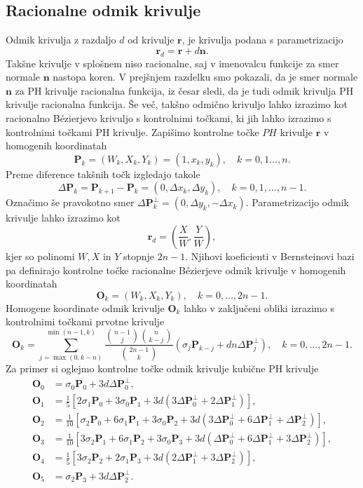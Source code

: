 \documentclass[isrm2, tisk]{fmfdelo}
\newcommand{\mycomment}[1]{\textbf{\textcolor{red}{#1}}}
\begin{document}
    \subsection{Racionalne odmik krivulje}
    Odmik krivulja z razdaljo $d$ od krivulje $\mathbf{r}$, je krivulja podana s parametrizacijo \[\mathbf{r}_d=\mathbf{r} + d\mathbf{n}.\]
    Takšne krivulje v splošnem niso racionalne, saj v imenovalcu funkcije za smer normale $\mathbf{n}$ nastopa koren.
    V prejšnjem razdelku smo pokazali, da je smer normale $\mathbf{n}$ za PH krivulje racionalna funkcija, iz česar sledi, da je tudi odmik krivulja PH krivulje racionalna funkcija.
    Še več, takšno odmično krivuljo lahko izrazimo kot racionalno Bézierjevo krivuljo s kontrolnimi točkami, ki jih lahko izrazimo s kontrolnimi točkami PH krivulje.
    Zapišimo kontrolne točke $PH$ krivulje $\mathbf{r}$ v homogenih koordinatah
    \[\mathbf{P}_k = (W_k,X_k,Y_k) = (1,x_k,y_k), \quad k=0,1\ldots,n. \]
    Preme diference takšnih točk izgledajo takole
    \[\Delta\mathbf{P}_k = \mathbf{P}_{k+1}-\mathbf{P}_k = (0,\Delta x_k,\Delta y_k), \quad k=0,1,\ldots,n-1.\]
    Označimo še pravokotno smer $\Delta\mathbf{P}_k^{\perp} =  (0,\Delta y_k, -\Delta x_k)$.
    Parametrizacijo odmik krivulje lahko izrazimo kot
    \[\mathbf{r}_d=\left(\frac{X}{W}, \frac{Y}{W}\right),\]
    kjer so polinomi $W,X$ in $Y$ stopnje $2n-1$.
    Njihovi koeficienti v Bernsteinovi bazi pa definirajo kontrolne točke racionalne Bézierjeve odmik krivulje v homogenih koordinatah
    \[\mathbf{O}_k=(W_k,X_k,Y_k),\quad k=0,\ldots,2n-1.\]
    Homogene koordinate odmik krivulje $\mathbf{O}_k$ lahko v zaključeni obliki izrazimo s kontrolnimi točkami prvotne krivulje
    \[\mathbf{O}_k= \sum_{j=\max(0,k-n)}^{\min(n-1,k)} \frac{\binom{n-1}{j}\binom{n}{k-j} }{\binom{2n-1}{k}}(\sigma_j\mathbf{P}_{k-j} + dn\Delta \mathbf{P}_j^{\perp}),\quad k=0,\ldots,2n-1.        \]
    Za primer si oglejmo kontrolne točke odmik krivulje kubične PH krivulje
    \begin{align*}
        \mathbf{O}_0 &= \sigma_0\mathbf{P}_0+3d\Delta\mathbf{P}_0^{\perp},  \\
        \mathbf{O}_1 &= \frac{1}{5} \left[ 2\sigma_1\mathbf{P}_0+ 3\sigma_0\mathbf{P}_1 + 3d(3\Delta\mathbf{P}_0^{\perp} + 2\Delta\mathbf{P}_1^{\perp})\right], \\
        \mathbf{O}_2 &= \frac{1}{10} \left[\sigma_2\mathbf{P}_0+ 6\sigma_1\mathbf{P}_1 + 3\sigma_0\mathbf{P}_2 + 3d(3\Delta\mathbf{P}_0^{\perp} + 6\Delta\mathbf{P}_1^{\perp}+\Delta\mathbf{P}_2^{\perp})\right], \\
        \mathbf{O}_3 &= \frac{1}{10} \left[3\sigma_2\mathbf{P}_1+ 6\sigma_1\mathbf{P}_2 + 3\sigma_0\mathbf{P}_3 + 3d(\Delta\mathbf{P}_0^{\perp} + 6\Delta\mathbf{P}_1^{\perp}+3\Delta\mathbf{P}_2^{\perp})\right], \\
        \mathbf{O}_4 &= \frac{1}{5} \left[3\sigma_2\mathbf{P}_2+ 2\sigma_1\mathbf{P}_3 + 3d(2\Delta\mathbf{P}_1^{\perp} + 3\Delta\mathbf{P}_2^{\perp})\right], \\
        \mathbf{O}_5 &= \sigma_2\mathbf{P}_3+3d\Delta\mathbf{P}_2^{\perp}.
    \end{align*}
\end{document}
